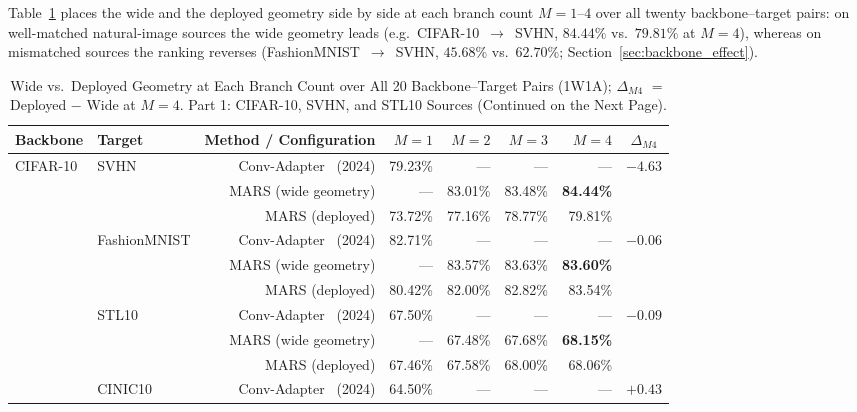 \documentclass[12pt, a4paper]{report}
\numberwithin{equation}{chapter}
\numberwithin{figure}{chapter}
\numberwithin{table}{chapter}
\numberwithin{algorithm}{chapter}
\begin{document}
Table~\ref{tab:sw_hw_version} places the wide and the deployed geometry side by side at each branch count $M{=}1$--$4$ over all twenty backbone--target pairs: on well-matched natural-image sources the wide geometry leads (e.g.\ CIFAR-10~$\to$~SVHN, $84.44\%$ vs.\ $79.81\%$ at $M{=}4$), whereas on mismatched sources the ranking reverses (FashionMNIST~$\to$~SVHN, $45.68\%$ vs.\ $62.70\%$; Section~\ref{sec:backbone_effect}).

\begin{table}[H]
\centering
\caption{Wide vs.\ Deployed Geometry at Each Branch Count over All 20 Backbone--Target Pairs (1W1A); $\Delta_{M4}$ $=$ Deployed $-$ Wide at $M{=}4$. Part 1: CIFAR-10, SVHN, and STL10 Sources (Continued on the Next Page).}
\label{tab:sw_hw_version}
\footnotesize
\renewcommand{\arraystretch}{0.92}%
\setlength{\tabcolsep}{4pt}%
\setlength{\aboverulesep}{0.15ex}%
\setlength{\belowrulesep}{0.3ex}%
\begin{tabular}{llrrrrrc}
\toprule
\textbf{Backbone} & \textbf{Target} & \multicolumn{1}{l}{\textbf{Method / Configuration}} & \textbf{$M{=}1$} & \textbf{$M{=}2$} & \textbf{$M{=}3$} & \textbf{$M{=}4$} & \textbf{$\Delta_{M4}$} \\
\midrule
\multirow{12}{*}{CIFAR-10} & \multirow{3}{*}{SVHN} & Conv-Adapter~\cite{Chen2024ConvAdapter} (2024) & 79.23\% & --- & --- & --- & \multirow{3}{*}{$-4.63$} \\
 & & MARS (wide geometry) & --- & 83.01\% & 83.48\% & \textbf{84.44\%} & \\
 & & MARS (deployed) & 73.72\% & 77.16\% & 78.77\% & 79.81\% & \\
\cmidrule(lr){2-8}
 & \multirow{3}{*}{FashionMNIST} & Conv-Adapter~\cite{Chen2024ConvAdapter} (2024) & 82.71\% & --- & --- & --- & \multirow{3}{*}{$-0.06$} \\
 & & MARS (wide geometry) & --- & 83.57\% & 83.63\% & \textbf{83.60\%} & \\
 & & MARS (deployed) & 80.42\% & 82.00\% & 82.82\% & 83.54\% & \\
\cmidrule(lr){2-8}
 & \multirow{3}{*}{STL10} & Conv-Adapter~\cite{Chen2024ConvAdapter} (2024) & 67.50\% & --- & --- & --- & \multirow{3}{*}{$-0.09$} \\
 & & MARS (wide geometry) & --- & 67.48\% & 67.68\% & \textbf{68.15\%} & \\
 & & MARS (deployed) & 67.46\% & 67.58\% & 68.00\% & 68.06\% & \\
\cmidrule(lr){2-8}
 & \multirow{3}{*}{CINIC10} & Conv-Adapter~\cite{Chen2024ConvAdapter} (2024) & 64.50\% & --- & --- & --- & \multirow{3}{*}{$+0.43$} \\

\end{tabular}
\end{table}
\end{document}

